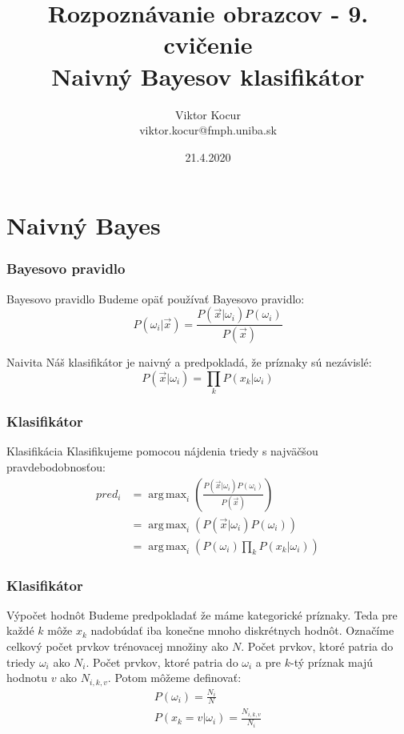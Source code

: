 \documentclass{beamer}
\title[Stromy]{Rozpoznávanie obrazcov - 9. cvičenie \\ Naivný Bayesov klasifikátor}
\author[Viktor Kocur]{Viktor Kocur \\{\small viktor.kocur@fmph.uniba.sk}}
\institute{DAI FMFI UK}
\date{21.4.2020}
\DeclareMathOperator*{\argmax}{arg\,max}
\begin{document}

\begin{frame}[plain]
  \titlepage  
\end{frame}

\section{Naivný Bayes}

\begin{frame}
\frametitle{Bayesovo pravidlo}
\begin{block}{Bayesovo pravidlo}
Budeme opäť používať Bayesovo pravidlo:
\begin{equation}
P(\omega_i | \vec{x}) = \frac{P(\vec{x}|\omega_i) P(\omega_i)}{P(\vec{x})}
\end{equation}
\end{block}

\begin{block}{Naivita}
Náš klasifikátor je naivný a predpokladá, že príznaky sú nezávislé:
\begin{equation}
P(\vec{x}|\omega_i) = \prod_{k} P(x_k | \omega_i)
\end{equation}
\end{block}
\end{frame}


\begin{frame}
\frametitle{Klasifikátor}
\begin{block}{Klasifikácia}
Klasifikujeme pomocou nájdenia triedy s najväčšou pravdebodobnosťou:
\begin{align}
pred_i &= \argmax_i \left( \frac{P(\vec{x}|\omega_i) P(\omega_i)}{P(\vec{x})} \right) \\
          &= \argmax_i \left(P(\vec{x}|\omega_i) P(\omega_i) \right) \\
          &= \argmax_i \left(P(\omega_i) \prod_{k} P(x_k | \omega_i) \right)
\end{align}
\end{block}
\end{frame}


\begin{frame}
\frametitle{Klasifikátor}
\begin{block}{Výpočet hodnôt}
Budeme predpokladať že máme kategorické príznaky. Teda pre každé $k$ môže $x_k$ nadobúdať iba konečne mnoho diskrétnych hodnôt. Označíme celkový počet prvkov trénovacej množiny ako $N$. Počet prvkov, ktoré patria do triedy $\omega_i$ ako $N_i$. Počet prvkov, ktoré patria do $\omega_i$ a pre $k$-tý príznak majú hodnotu $v$ ako $N_{i,k,v}$. Potom môžeme definovať:
\begin{gather}
P(\omega_i) = \frac{N_i}{N} \\
P(x_k = v | \omega_i) = \frac{N_{i,k,v}}{N_i} 
\end{gather}
\end{block}
\end{frame}
\end{document}
